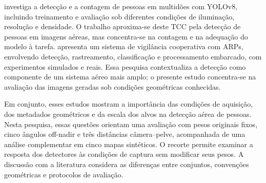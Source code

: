  investiga a detecção e a contagem de pessoas em multidões com YOLOv8, incluindo treinamento e avaliação sob diferentes condições de iluminação, resolução e densidade. O trabalho aproxima-se deste TCC pela detecção de pessoas em imagens aéreas, mas concentra-se na contagem e na adequação do modelo à tarefa.  apresenta um sistema de vigilância cooperativa com ARPs, envolvendo detecção, rastreamento, classificação e processamento embarcado, com experimentos simulados e reais. Essa pesquisa contextualiza a detecção como componente de um sistema aéreo mais amplo; o presente estudo concentra-se na avaliação das imagens geradas sob condições geométricas conhecidas.

Em conjunto, esses estudos mostram a importância das condições de aquisição, dos metadados geométricos e da escala dos alvos na detecção aérea de pessoas. Nesta pesquisa, essas questões orientam uma avaliação com pesos originais fixos, cinco ângulos off-nadir e três distâncias câmera--pelve, acompanhada de uma análise complementar em cinco mapas sintéticos. O recorte permite examinar a resposta dos detectores às condições de captura sem modificar seus pesos. A discussão com a literatura considera as diferenças entre conjuntos, convenções geométricas e protocolos de avaliação.
